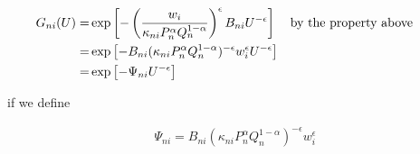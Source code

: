 \documentclass[10pt]{article}
\begin{document}
\begin{align}
    G_{n i}(U)=&\exp \left[-\left(\frac{w_i}{\kappa_{n i} P_n^\alpha Q_n^{1-\alpha}}\right)^{\epsilon} B_{n i} U^{-\epsilon}\right] && \parbox[t]{4cm}{\raggedright by the property above} \\
    =&\exp \left[-B_{ni} (\kappa_{n i} P_n^\alpha Q_n^{1-\alpha})^{-\epsilon} w_i^\epsilon U^{-\epsilon}\right] \\
    =&\exp \left[- \Psi_{n i} U^{-\epsilon}\right]
\end{align}

if we define

\begin{align}
    \Psi_{ni} = B_{n i} \left(\kappa_{n i} P_n^\alpha Q_n^{1-\alpha}\right)^{-\epsilon} w_i^\epsilon
\end{align}
\end{document}
